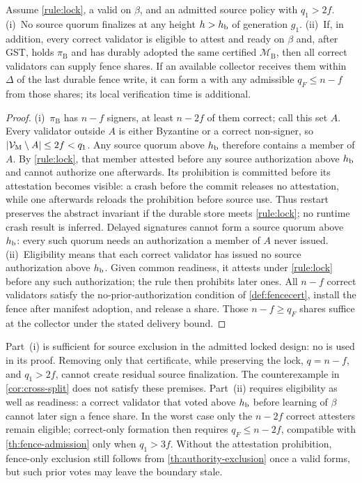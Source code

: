 \begin{lemma}
\label{lem:fence-live}
Assume \cref{rule:lock}, a valid \CutCert{} on $\beta$, and an admitted source policy with $q_1>2f$.
(i)~No source quorum finalizes at any height $h>h_{\mathrm b}$ of generation $g_1$. (ii)~If, in addition, every
correct validator is eligible to attest and ready on $\beta$ and, after GST, holds $\pi_{\mathrm B}$
and has durably adopted the same certified $\mathcal M_{\mathrm B}$, then all correct validators
can supply fence shares. If an available collector receives them within $\Delta$ of the last
durable fence write, it can form a \FenceCert{} with any admissible $q_F\le n-f$ from those
shares; its local verification time is additional.
\end{lemma}
\begin{proof}
(i)~$\pi_{\mathrm B}$ has $n-f$ signers, at least $n-2f$ of them correct; call this set $A$. Every
validator outside $A$ is either Byzantine or a correct non-signer, so $|\mathcal{V}_{\mathrm M}\setminus A|\le 2f<q_1$.
Any source quorum above $h_{\mathrm b}$ therefore contains a member of $A$. By \cref{rule:lock}, that member
attested before any source authorization above $h_{\mathrm b}$ and cannot authorize one afterwards. Its
prohibition is committed before its attestation becomes visible: a crash before the commit
releases no attestation, while one afterwards reloads the prohibition before source use. Thus
restart preserves the abstract invariant if the durable store meets \cref{rule:lock}; no runtime
crash result is inferred. Delayed signatures cannot form a source quorum above $h_{\mathrm b}$: every
such quorum needs an authorization a member of $A$ never issued.
(ii)~Eligibility means that each correct validator has issued no source authorization above $h_{\mathrm b}$.
Given common readiness, it attests under \cref{rule:lock} before any such authorization; the rule
then prohibits later ones. All $n-f$ correct validators satisfy the no-prior-authorization
condition of \cref{def:fencecert}, install the fence after manifest adoption, and release a share.
Those $n-f\ge q_F$ shares suffice at the collector under the stated delivery bound.
\end{proof}

\begin{remark}
Part~(i) is sufficient for source exclusion in the admitted locked design: no \FenceCert{} is used
in its proof. Removing only that certificate, while preserving the lock, $q=n-f$, and $q_1>2f$,
cannot create residual source finalization. The counterexample in \cref{cor:cross-split} does not
satisfy these premises. Part~(ii) requires eligibility as well as readiness: a correct validator
that voted above $h_{\mathrm b}$ before learning of $\beta$ cannot later sign a fence share. In the worst
case only the $n-2f$ correct attesters remain eligible; correct-only formation then requires
$q_F\le n-2f$, compatible with \cref{th:fence-admission} only when $q_1>3f$. Without the
attestation prohibition, fence-only exclusion still follows from \cref{th:authority-exclusion}
once a valid \FenceCert{} forms, but such prior votes may leave the boundary stale.
\end{remark}

